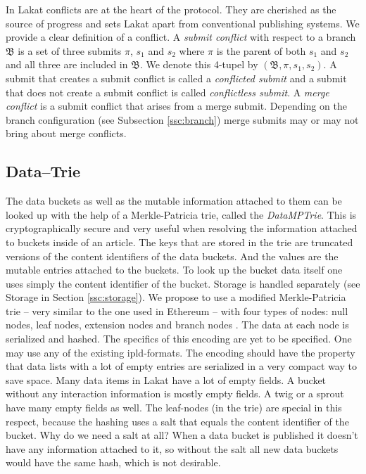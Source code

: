 In Lakat conflicts are at the heart of the protocol. They are cherished as the source of progress and sets Lakat apart from conventional publishing systems. We provide a clear definition of a conflict. A \textit{submit conflict} with respect to a branch $\mathfrak B$ is a set 
of three submits $\pi$, $s_1$ and $s_2$ where $\pi$ is the parent of both $s_1$ and $s_2$ and all three are included in $\mathfrak B$. We denote this 4-tupel by $(\mathfrak B, \pi, s_1, s_2)$.
A submit that creates a submit conflict is called a \textit{conflicted submit} and a submit that does not create a submit conflict is called \textit{conflictless submit}.
A \textit{merge conflict} is a submit conflict that arises from a merge submit. Depending on the branch configuration (see Subsection \ref{ssc:branch}) merge submits may or may not bring about merge conflicts. 


\subsection{Data--Trie}
\label{ssc:datatrie}

The data buckets as well as the mutable information attached to them can be looked up with the help of a Merkle-Patricia trie, called the \textit{DataMPTrie}. This is cryptographically secure and very useful when resolving the information attached to buckets inside of an article. The keys that are stored in the trie are truncated versions of the content identifiers of the data buckets. And the values are the mutable entries attached to the buckets. To look up the bucket data itself one uses simply the content identifier of the bucket. Storage is handled separately (see Storage in Section \ref{ssc:storage}).
We propose to use a modified Merkle-Patricia trie -- very similar to the one used in Ethereum -- with four types of nodes: null nodes, leaf nodes, extension nodes and branch nodes \cite{}.
The data at each node is serialized and hashed. The specifics of this encoding are yet to be specified. One may use any of the existing ipld-formats. The encoding should have the property that data lists with a lot of empty entries are serialized in a very compact way to save space. Many data items in Lakat have a lot of empty fields. A bucket without any interaction information is mostly empty fields. A twig or a sprout have many empty fields as well. The leaf-nodes (in the trie) are special in this respect, because the hashing uses a salt that equals the content identifier of the bucket. Why do we need a salt at all? When a data bucket is published it doesn't have any information attached to it, so without the salt all new data buckets would have the same hash, which is not desirable.





